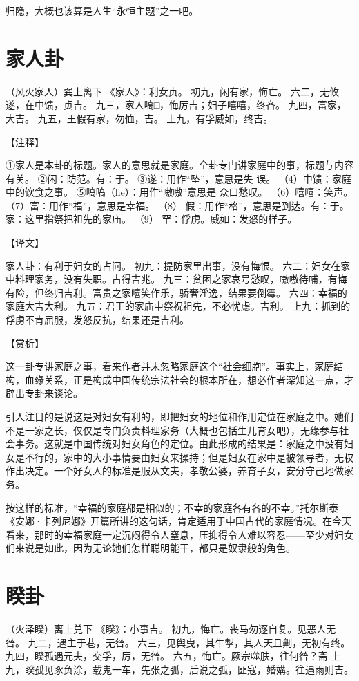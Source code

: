 \documentclass[a4paper,12pt,UTF8,twoside]{ctexbook}
\begin{document}
归隐，大概也该算是人生“永恒主题”之一吧。

\chapter{家人卦}

（风火家人）巽上离下
《家人》：利女贞。
初九，闲有家，悔亡。
六二，无攸遂，在中馈，贞吉。
九三，家人嗃□，悔厉吉；妇子嘻嘻，终吝。
九四，富家，大吉。
九五，王假有家，勿恤，吉。
上九，有孚威如，终吉。

【注释】

①家人是本卦的标题。家人的意思就是家庭。全卦专门讲家庭中的事，标题与内容有关。
②闲：防范。有：于。
③遂：用作“坠”，意思是失 误。
（4）中馈：家庭中的饮食之事。
⑤嗃嗃（he）：用作“嗷嗷”意思是 众口愁叹。
（6）嘻嘻：笑声。
（7）富：用作“福”，意思是幸福。
（8） 假：用作“格”，意思是到达。有：于。家：这里指祭把祖先的家庙。
（9） 罕：俘虏。威如：发怒的样子。

【译文】

家人卦：有利于妇女的占问。
初九：提防家里出事，没有悔恨。
六二：妇女在家中料理家务，没有失职。占得吉兆。
九三：贫困之家哀号愁叹，嗷嗷待哺，有悔有险，但终归吉利。富贵之家嘻笑作乐，骄奢淫逸，结果要倒霉。
六四：幸福的家庭大吉大利。
九五：君王的家庙中祭祝祖先，不必忧虑。吉利。
上九：抓到的俘虏不肯屈服，发怒反抗，结果还是吉利。

【赏析】

这一卦专讲家庭之事，看来作者并未忽略家庭这个“社会细胞”。事实上，家庭结构，血缘关系，正是构成中国传统宗法社会的根本所在，想必作者深知这一点，才辟出专卦来谈论。

引人注目的是说这是对妇女有利的，即把妇女的地位和作用定位在家庭之中。她们不是一家之长，仅仅是专门负责料理家务（大概也包括生儿育女吧），无缘参与社会事务。这就是中国传统对妇女角色的定位。由此形成的结果是：家庭之中没有妇女是不行的，家中的大小事情要由妇女来操持；但是妇女在家中是被领导者，无权作出决定。一个好女人的标准是服从文夫，孝敬公婆，养育子女，安分守己地做家务。

按这样的标准，“幸福的家庭都是相似的；不幸的家庭各有各的不幸。”托尔斯泰《安娜·卡列尼娜》开篇所讲的这句话，肯定适用于中国古代的家庭情况。在今天看来，那时的幸福家庭一定沉闷得令人窒息，压抑得令人难以容忍——至少对妇女们来说是如此，因为无论她们怎样聪明能干，都只是奴隶般的角色。

\chapter{睽卦}

（火泽睽）离上兑下
《睽》：小事吉。
初九，悔亡。丧马勿逐自复。见恶人无咎。
九二，遇主于巷，无咎。
六三，见舆曳，其牛掣，其人天且劓，无初有终。
九四，睽孤遇元夫，交孚，厉，无咎。
六五，悔亡。厥宗噬肤，往何咎？斋
上九，睽孤见豕负涂，载鬼一车，先张之弧，后说之弧，匪寇，婚媾。往遇雨则吉。
\end{document}
